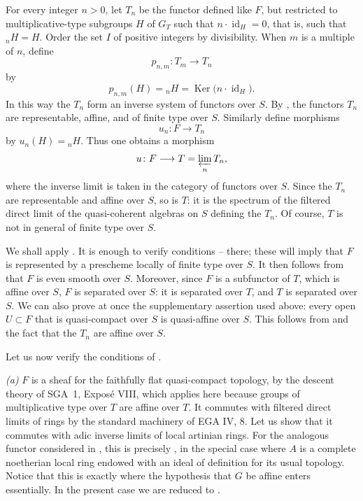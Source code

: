 For every integer \(n>0\), let \(T_n\) be the functor defined like
\(F\), but restricted to multiplicative-type subgroups \(H\) of
\(G_T\) such that \(n\cdot\operatorname{id}_H=0\), that is, such
that \({}_nH=H\).  Order the set \(I\) of positive integers by
divisibility.  When \(m\) is a multiple of \(n\), define
\[
  p_{n,m}\colon T_m\longrightarrow T_n
\]
by
\[
  p_{n,m}(H)={}_nH=\operatorname{Ker}
  \bigl(n\cdot\operatorname{id}_H\bigr).
\]
In this way the \(T_n\) form an inverse system of functors over
\(S\).  By
, the functors
\(T_n\) are representable, affine, and of finite type over \(S\).
Similarly define morphisms
\[
  u_n\colon F\longrightarrow T_n
\]
by \(u_n(H)={}_nH\).  Thus one obtains a morphism
\[
  u\colon F\longrightarrow T=\varprojlim_n T_n,
\]
where the inverse limit is taken in the category of functors over
\(S\).  Since the \(T_n\) are representable and affine over \(S\),
so is \(T\): it is the spectrum of the filtered direct limit of the
quasi-coherent algebras on \(S\) defining the \(T_n\).  Of course,
\(T\) is not in general of finite type over \(S\).

We shall apply .  It is
enough to verify conditions \textit{}--\textit{} there; these
will imply that \(F\) is represented by a prescheme locally of finite
type over \(S\).  It then follows from
 that \(F\) is even
smooth over \(S\).  Moreover, since \(F\) is a subfunctor of \(T\),
which is affine over \(S\), \(F\) is separated over \(S\): it is
separated over \(T\), and \(T\) is separated over \(S\).  We can
also prove at once the supplementary assertion used above: every
open \(U\subset F\) that is quasi-compact over \(S\) is quasi-affine
over \(S\).  This follows from
 and the fact that the
\(T_n\) are affine over \(S\).

Let us now verify the conditions of
.

\smallskip
\noindent{}\textit{(a)}
\(F\) is a sheaf for the faithfully flat quasi-compact topology, by
the descent theory of SGA~1, Exposé VIII, which applies here because
groups of multiplicative type over \(T\) are affine over
\(T\). It
commutes with filtered direct limits of rings by the standard
machinery of EGA IV, 8.  Let us show that it commutes with adic
inverse limits of local artinian rings.  For the analogous functor
considered in , this is
precisely , in the special case where \(A\) is a
complete noetherian local ring endowed with an ideal of definition
for its usual topology.  Notice that this is exactly where the
hypothesis that \(G\) be affine enters essentially.  In the present
case we are reduced to .

